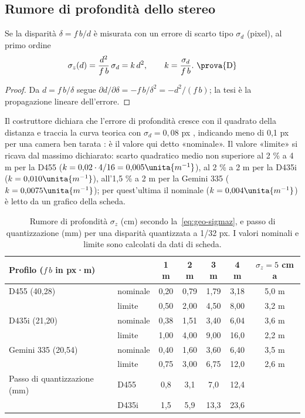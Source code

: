 \subsection{Rumore di profondità dello stereo}\label{sec:geo-rumore}

\begin{proposizione}\label{prop:geo-rumore}
Se la disparità $\delta=f\,b/d$ è misurata con un errore di scarto tipo $\sigma_d$ (pixel), al primo ordine
\begin{equation}\label{eq:geo-sigmaz}
\sigma_z(d)=\frac{d^2}{f\,b}\,\sigma_d=k\,d^2,\qquad k=\frac{\sigma_d}{f\,b}.\ \text{\prova{D}}
\end{equation}
\end{proposizione}
\begin{proof}
Da $d=f\,b/\delta$ segue $\partial d/\partial\delta=-f\,b/\delta^2=-d^2/(f\,b)$; la tesi è la propagazione lineare dell'errore.
\end{proof}

Il costruttore dichiara che l'errore di profondità cresce con il quadrato della distanza e traccia la curva teorica con $\sigma_d=0{,}08$ px \cite{realsense-taratura-profondita}, indicando meno di 0,1 px per una camera ben tarata \cite{realsense-bkm-taratura}: è il valore qui detto «nominale». Il valore «limite» si ricava dal massimo dichiarato: scarto quadratico medio non superiore al 2 \% a 4 m per la D455 \cite{realsense-d455} ($k=0{,}02\cdot4/16=0{,}005\unita{m^{-1}}$), al 2 \% a 2 m per la D435i \cite{realsense-d400-accuratezza} ($k=0{,}010\unita{m^{-1}}$), all'1,5 \% a 2 m per la Gemini 335 \cite{orbbec-gemini-335} ($k=0{,}0075\unita{m^{-1}}$); per quest'ultima il nominale ($k=0{,}004\unita{m^{-1}}$) è letto da un grafico della scheda.

\begin{table}[htb]\centering\small
\caption{Rumore di profondità $\sigma_z$ (cm) secondo la~\eqref{eq:geo-sigmaz}, e passo di quantizzazione (mm) per una disparità quantizzata a 1/32 px. I valori nominali e limite sono calcolati da dati di scheda. }\label{tab:geo-rumore}
\begin{tabular}{@{}llccccc@{}}
\toprule
Profilo ($f\,b$ in px·m) & & 1 m & 2 m & 3 m & 4 m & $\sigma_z=5$ cm a\\
\midrule
D455 (40,28) & nominale & 0,20 & 0,79 & 1,79 & 3,18 & 5,0 m\\
 & limite & 0,50 & 2,00 & 4,50 & 8,00 & 3,2 m\\
D435i (21,20) & nominale & 0,38 & 1,51 & 3,40 & 6,04 & 3,6 m\\
 & limite & 1,00 & 4,00 & 9,00 & 16,0 & 2,2 m\\
Gemini 335 (20,54) & nominale & 0,40 & 1,60 & 3,60 & 6,40 & 3,5 m\\
 & limite & 0,75 & 3,00 & 6,75 & 12,0 & 2,6 m\\
\midrule
Passo di quantizzazione (mm) & D455 & 0,8 & 3,1 & 7,0 & 12,4 & \\
 & D435i & 1,5 & 5,9 & 13,3 & 23,6 & \\
\bottomrule
\end{tabular}
\end{table}

